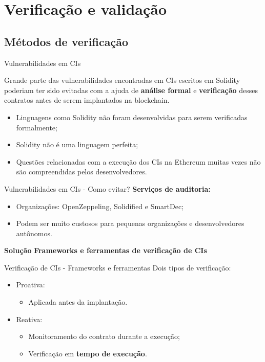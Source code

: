\section{Verificação e validação}
\subsection{Métodos de verificação}

\begin{frame}{Vulnerabilidades em CIs}
    \begin{block}{}
    Grande parte das vulnerabilidades encontradas em CIs escritos em Solidity poderiam ter sido evitadas com a ajuda de \textbf{análise formal} e \textbf{verificação} desses contratos antes de serem implantados na blockchain.
    \end{block}
    \begin{itemize}
        \item Linguagens como Solidity não foram desenvolvidas para serem verificadas formalmente;
        \item Solidity não é uma linguagem perfeita;
        \item Questões relacionadas com a execução dos CIs na Ethereum muitas vezes não são compreendidas pelos desenvolvedores.
    \end{itemize}
\end{frame}

\begin{frame}{Vulnerabilidades em CIs - Como evitar?}
    \textbf{Serviços de auditoria:}
    \begin{itemize}
        \item Organizações: OpenZeppeling, Solidified e SmartDec;
        \item Podem ser muito custosos para pequenas organizações e desenvolvedores autônomos.
    \end{itemize}
    \begin{exampleblock}{\textbf{Solução}}
    \textbf{Frameworks e ferramentas de verificação de CIs}
    \end{exampleblock}
\end{frame}

\begin{frame}{Verificação de CIs - Frameworks e ferramentas}
    Dois tipos de verificação:
    \begin{itemize}
        \item Proativa:
        \begin{itemize}
            \item Aplicada antes da implantação.
        \end{itemize}
        \item Reativa:
        \begin{itemize}
            \item Monitoramento do contrato durante a execução;
            \item Verificação em \textbf{tempo de execução}.
        \end{itemize}
    \end{itemize}
\end{frame}


